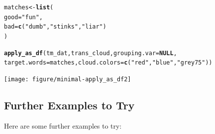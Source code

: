 \documentclass{article}\usepackage[]{graphicx}\usepackage[]{color}
\makeatletter
\newcommand{\hlstr}[1]{\textcolor[rgb]{0.192,0.494,0.8}{#1}}%
\newcommand{\hlstd}[1]{\textcolor[rgb]{0.345,0.345,0.345}{#1}}%
\newcommand{\hlkwa}[1]{\textcolor[rgb]{0.161,0.373,0.58}{\textbf{#1}}}%
\newcommand{\hlkwb}[1]{\textcolor[rgb]{0.69,0.353,0.396}{#1}}%
\newcommand{\hlkwc}[1]{\textcolor[rgb]{0.333,0.667,0.333}{#1}}%
\newcommand{\hlkwd}[1]{\textcolor[rgb]{0.737,0.353,0.396}{\textbf{#1}}}%
\newenvironment{kframe}{%
 \def\at@end@of@kframe{}%
 \ifinner\ifhmode%
  \def\at@end@of@kframe{\end{minipage}}%
  \begin{minipage}{\columnwidth}%
 \fi\fi%
 \def\FrameCommand##1{\hskip\@totalleftmargin \hskip-\fboxsep
 \colorbox{shadecolor}{##1}\hskip-\fboxsep
     \hskip-\linewidth \hskip-\@totalleftmargin \hskip\columnwidth}%
 \MakeFramed {\advance\hsize-\width
   \@totalleftmargin\z@ \linewidth\hsize
   \@setminipage}}%
 {\par\unskip\endMakeFramed%
 \at@end@of@kframe}
\newenvironment{knitrout}{}{} %
\makeatother
\begin{document}
\begin{knitrout}
\color{fgcolor}\begin{kframe}
\begin{alltt}
\hlstd{matches} \hlkwb{<-} \hlkwd{list}\hlstd{(}
    \hlkwc{good} \hlstd{=} \hlstr{"fun"}\hlstd{,}
    \hlkwc{bad} \hlstd{=} \hlkwd{c}\hlstd{(}\hlstr{"dumb"}\hlstd{,} \hlstr{"stinks"}\hlstd{,} \hlstr{"liar"}\hlstd{)}
\hlstd{)}

\hlkwd{apply_as_df}\hlstd{(tm_dat, trans_cloud,} \hlkwc{grouping.var}\hlstd{=}\hlkwa{NULL}\hlstd{,}
    \hlkwc{target.words}\hlstd{=matches,} \hlkwc{cloud.colors} \hlstd{=} \hlkwd{c}\hlstd{(}\hlstr{"red"}\hlstd{,} \hlstr{"blue"}\hlstd{,} \hlstr{"grey75"}\hlstd{))}
\end{alltt}
\end{kframe}
\end{knitrout}


\begin{knitrout}
\color{fgcolor}

{\centering \texttt{[image: figure/minimal-apply\_as\_df2]} 

}



\end{knitrout}


\subsection{Further Examples to Try}

Here are some further examples to try:
\end{document}
